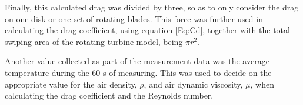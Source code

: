 Finally, this calculated drag was divided by three, so as to only consider the drag on one disk or one set of rotating blades. This force was further used in calculating the drag coefficient, using equation \ref{Eq:Cd}, together with the total swiping area of the rotating turbine model, being $\pi r^2$.

Another value collected as part of the measurement data was the average temperature during the 60 \si{\s} of measuring. This was used to decide on the appropriate value for the air density, $\rho$, and air dynamic viscosity, $\mu$, when calculating the drag coefficient and the Reynolds number. 

\FloatBarrier

